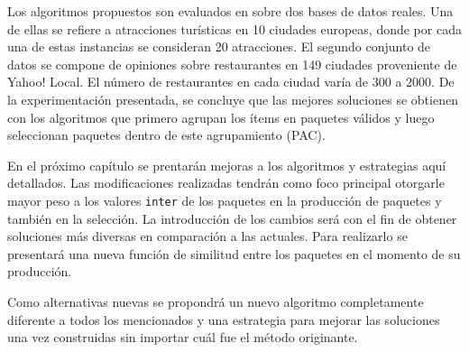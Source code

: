Los algoritmos propuestos son evaluados en \cite{journals/tkde/Amer-YahiaBCFMZ14} sobre dos bases de datos reales. Una de ellas se refiere a atracciones turísticas en 10 ciudades europeas, donde por cada una de estas instancias se consideran 20 atracciones. El segundo conjunto de datos se compone de opiniones sobre restaurantes en 149 ciudades proveniente de Yahoo! Local. El número de restaurantes en cada ciudad varía de 300 a 2000. De la experimentación presentada, se concluye que las mejores soluciones se obtienen con los algoritmos que primero agrupan los ítems en paquetes válidos y luego seleccionan paquetes dentro de este agrupamiento (PAC).

En el próximo capítulo se prentarán mejoras a los algoritmos y estrategias aquí detallados. Las modificaciones realizadas tendrán como foco principal otorgarle mayor peso a los valores \texttt{inter} de los paquetes en la producción de paquetes y también en la selección. La introducción de los cambios será con el fin de obtener soluciones más diversas en comparación a las actuales. Para realizarlo se presentará una nueva función de similitud entre los paquetes en el momento de su producción. 

Como alternativas nuevas se propondrá un nuevo algoritmo completamente diferente a todos los mencionados y una estrategia para mejorar las soluciones una vez construidas sin importar cuál fue el método originante.
